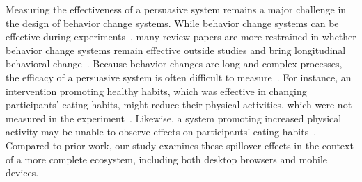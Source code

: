 
Measuring the effectiveness of a persuasive system remains a major challenge in the design of behavior change systems. While behavior change systems can be effective during experiments~\cite{doi:10.1080/15228830802094429, Cuijpers2008, info:doi/10.2196/jmir.1376}, many review papers are more restrained in whether behavior change systems remain effective outside studies and bring longitudinal behavioral change~\cite{doi:10.1111/j.1467-789X.2009.00646.x, 10.1371/journal.pmed.1000387, NORMAN2007336, 10.1007/978-3-319-07127-5_11}. Because behavior changes are long and complex processes, the efficacy of a persuasive system is often difficult to measure~\cite{prochaska1997transtheoretical}. For instance, an intervention promoting healthy habits, which was effective in changing participants' eating habits, might reduce their physical activities, which were not measured in the experiment~\cite{COTTER2014243}. Likewise, a system promoting increased physical activity may be unable to observe effects on participants' eating habits~\cite{doi:10.1111/j.1740-9713.2015.00863.x}. Compared to prior work, our study examines these spillover effects in the context of a more complete ecosystem, including both desktop browsers and mobile devices. %

